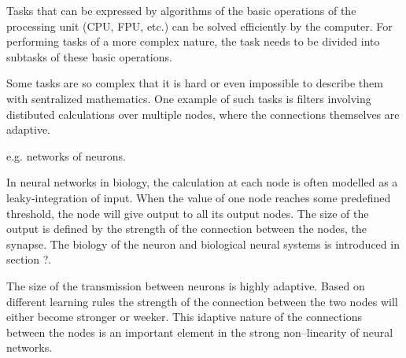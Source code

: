 

	Tasks that can be expressed by algorithms of the basic operations of the processing unit (CPU, FPU, etc.) can be solved efficiently by the computer.
	For performing tasks of a more complex nature, the task needs to be divided into subtasks of these basic operations.

	Some tasks are so complex that it is hard or even impossible to describe them with sentralized mathematics.
	One example of such tasks is filters involving distibuted calculations over multiple nodes, where the connections themselves are adaptive.

	e.g. networks of neurons.

	In neural networks in biology, the calculation at each node is often modelled as a leaky-integration of input.
	When the value of one node reaches some predefined threshold, the node will give output to all its output nodes.
	The size of the output is defined by the strength of the connection between the nodes, the synapse.
	The biology of the neuron and biological neural systems is introduced in section ?.

	The size of the transmission between neurons is highly adaptive. Based on different learning rules the strength of the connection between the two nodes will either become stronger or weeker.
	This idaptive nature of the connections between the nodes is an important element in the strong non--linearity of neural networks.

